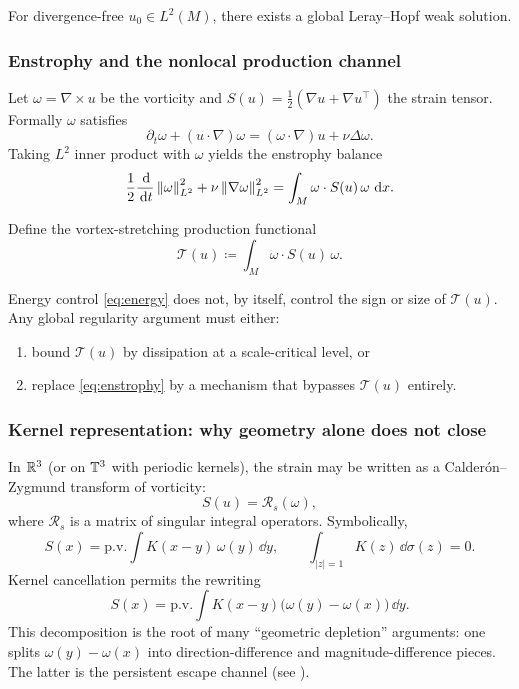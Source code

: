 \begin{theorem}
For divergence-free $u_0\in L^2(M)$, there exists a global Leray--Hopf weak solution.
\end{theorem}

\subsubsection{Enstrophy and the nonlocal production channel}
Let $\omega=\nabla\times u$ be the vorticity and $S(u)=\tfrac12(\nabla u+\nabla u^\top)$
the strain tensor. Formally $\omega$ satisfies
\begin{equation}\label{eq:vorticity}
\partial_t \omega + (u\cdot\nabla)\omega = (\omega\cdot\nabla)u + \nu \Delta \omega.
\end{equation}
Taking $L^2$ inner product with $\omega$ yields the enstrophy balance
\begin{equation}\label{eq:enstrophy}
\frac12\frac{\,\mathrm{d}}{\,\mathrm{d} t}\left\lVert \omega\right\rVert_{L^2}^2 + \nu \left\lVert \nabla \omega\right\rVert_{L^2}^2
= \int_{M}\omega\cdot S(u)\,\omega \,\,\mathrm{d} x.
\end{equation}

\begin{definition}\label{def:stretching}
Define the vortex-stretching production functional
\[
\mathcal T(u)\coloneqq\int_{M}\omega\cdot S(u)\,\omega.
\]
\end{definition}

\begin{proposition}\label{prop:first-wall}
Energy control \eqref{eq:energy} does not, by itself, control the sign or size of $\mathcal T(u)$.
Any global regularity argument must either:
\begin{enumerate}[label=(\alph*), leftmargin=2.1em]
\item bound $\mathcal T(u)$ by dissipation at a scale-critical level, or
\item replace \eqref{eq:enstrophy} by a mechanism that bypasses $\mathcal T(u)$ entirely.
\end{enumerate}
\end{proposition}

\subsubsection{Kernel representation: why geometry alone does not close}
In $\mathbb{R}^3$ (or on $\mathbb{T}^3$ with periodic kernels), the strain may be written as a Calder\'on--Zygmund
transform of vorticity:
\[
S(u)=\mathcal R_s(\omega),
\]
where $\mathcal R_s$ is a matrix of singular integral operators. Symbolically,
\[
S(x)=\mathrm{p.v.}\int K(x-y)\,\omega(y)\,\dd y,\qquad \int_{|z|=1}K(z)\,\dd\sigma(z)=0.
\]
Kernel cancellation permits the rewriting
\[
S(x)=\mathrm{p.v.}\int K(x-y)\big(\omega(y)-\omega(x)\big)\,\dd y.
\]
This decomposition is the root of many ``geometric depletion'' arguments: one splits
$\omega(y)-\omega(x)$ into direction-difference and magnitude-difference pieces.
The latter is the persistent escape channel (see ).

